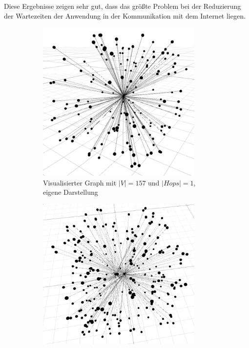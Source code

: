 \documentclass[12pt, a4paper]{article}
\begin{document}
Diese Ergebnisse zeigen sehr gut, dass das größte Problem bei der Reduzierung der Wartezeiten der Anwendung in der Kommunikation mit dem Internet liegen.
\begin{figure}
\centering
\begin{subfigure}[t]{0.45\textwidth}
\includegraphics[width=0.9\textwidth]{Roger_Waters_1Hop_157Nodes_FR406_WEB407.png}
\caption[Visualisierter Graph mit $|V|=157$ und $|Spruenge|=1$]{Visualisierter Graph mit $|V|=157$ und $|Hops|=1$, eigene Darstellung}
\label{graph_1hop}
\end{subfigure}
\begin{subfigure}[t]{0.45\textwidth}
\includegraphics[width=0.9\textwidth]{Roger_Waters_2Hop_250Nodes_FR1000_WEB1907.png}

\end{subfigure}
\end{figure}
\end{document}
